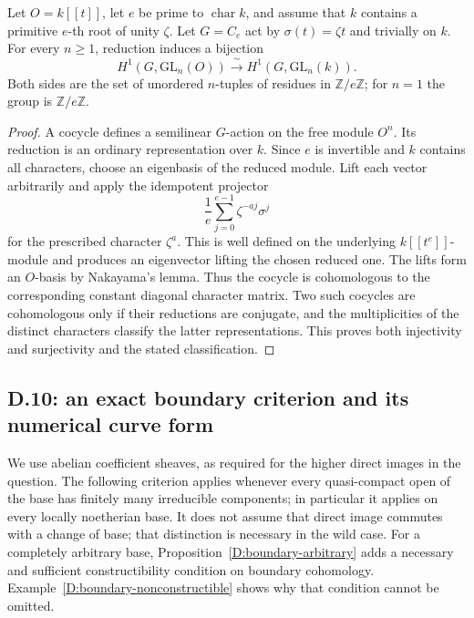 \begin{proposition}
\label{D:tame-GLn}
Let $O=k[[t]]$, let $e$ be prime to $\operatorname{char}k$, and assume
that $k$ contains a primitive $e$-th root of unity $\zeta$. Let
$G=C_e$ act by $\sigma(t)=\zeta t$ and trivially on $k$.
For every $n\geq1$, reduction induces a bijection
\[
 H^1(G,\mathrm{GL}_n(O))\xrightarrow{\ \sim\ }
 H^1(G,\mathrm{GL}_n(k)).
\]
Both sides are the set of unordered $n$-tuples of residues in
$\mathbb Z/e\mathbb Z$; for $n=1$ the group is $\mathbb Z/e\mathbb Z$.
\end{proposition}
\begin{proof}
A cocycle defines a semilinear $G$-action on the free module $O^n$.
Its reduction is an ordinary representation over $k$. Since $e$ is
invertible and $k$ contains all characters, choose an eigenbasis of
the reduced module. Lift each vector arbitrarily and apply the
idempotent projector
\[
 \frac1e\sum_{j=0}^{e-1}\zeta^{-aj}\sigma^j
\]
for the prescribed character $\zeta^a$. This is well defined on the
underlying $k[[t^e]]$-module and produces an eigenvector lifting the
chosen reduced one. The lifts form an $O$-basis by Nakayama's lemma.
Thus the cocycle is cohomologous to the corresponding constant diagonal
character matrix. Two such cocycles are cohomologous only if their
reductions are conjugate, and the multiplicities of the distinct
characters classify the latter representations. This proves both
injectivity and surjectivity and the stated classification.
\end{proof}

\subsection{D.10: an exact boundary criterion and its numerical curve form}

We use abelian coefficient sheaves, as required for the higher direct
images in the question. The following criterion applies whenever every
quasi-compact open of the base has finitely many irreducible components;
in particular it applies on every locally noetherian base. It does not
assume that direct image commutes with a change of base; that distinction
is necessary in the wild case. For a completely arbitrary base, Proposition~\ref{D:boundary-arbitrary}
adds a necessary and sufficient constructibility condition on boundary
cohomology. Example~\ref{D:boundary-nonconstructible} shows why that
condition cannot be omitted.

